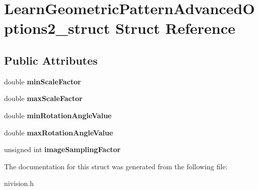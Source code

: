 \hypertarget{structLearnGeometricPatternAdvancedOptions2__struct}{
\section{LearnGeometricPatternAdvancedOptions2\_\-struct Struct Reference}
\label{structLearnGeometricPatternAdvancedOptions2__struct}
}
\subsection*{Public Attributes}
\begin{DoxyCompactItemize}
\item 
\hypertarget{structLearnGeometricPatternAdvancedOptions2__struct_a8425f258a24a9f7a45653a199930a083}{
double {\bfseries minScaleFactor}}
\label{structLearnGeometricPatternAdvancedOptions2__struct_a8425f258a24a9f7a45653a199930a083}

\item 
\hypertarget{structLearnGeometricPatternAdvancedOptions2__struct_ac234328a7649ea4a730a69d748894011}{
double {\bfseries maxScaleFactor}}
\label{structLearnGeometricPatternAdvancedOptions2__struct_ac234328a7649ea4a730a69d748894011}

\item 
\hypertarget{structLearnGeometricPatternAdvancedOptions2__struct_abe44b0888b2ea2e7685faae2e3a1de9d}{
double {\bfseries minRotationAngleValue}}
\label{structLearnGeometricPatternAdvancedOptions2__struct_abe44b0888b2ea2e7685faae2e3a1de9d}

\item 
\hypertarget{structLearnGeometricPatternAdvancedOptions2__struct_a15709c0e8677f0a91ad7ceb9cad66dc3}{
double {\bfseries maxRotationAngleValue}}
\label{structLearnGeometricPatternAdvancedOptions2__struct_a15709c0e8677f0a91ad7ceb9cad66dc3}

\item 
\hypertarget{structLearnGeometricPatternAdvancedOptions2__struct_a918affe9725fafb3b870ad5722d90ca0}{
unsigned int {\bfseries imageSamplingFactor}}
\label{structLearnGeometricPatternAdvancedOptions2__struct_a918affe9725fafb3b870ad5722d90ca0}

\end{DoxyCompactItemize}


The documentation for this struct was generated from the following file:\begin{DoxyCompactItemize}
\item 
nivision.h\end{DoxyCompactItemize}
